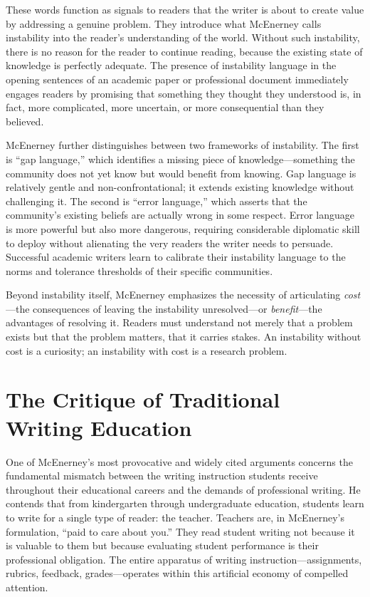 \documentclass[12pt]{article}
\begin{document}
These words function as signals to readers that the writer is about to create value by addressing a genuine problem. They introduce what McEnerney calls instability into the reader's understanding of the world. Without such instability, there is no reason for the reader to continue reading, because the existing state of knowledge is perfectly adequate. The presence of instability language in the opening sentences of an academic paper or professional document immediately engages readers by promising that something they thought they understood is, in fact, more complicated, more uncertain, or more consequential than they believed.

McEnerney further distinguishes between two frameworks of instability. The first is ``gap language,'' which identifies a missing piece of knowledge---something the community does not yet know but would benefit from knowing. Gap language is relatively gentle and non-confrontational; it extends existing knowledge without challenging it. The second is ``error language,'' which asserts that the community's existing beliefs are actually wrong in some respect. Error language is more powerful but also more dangerous, requiring considerable diplomatic skill to deploy without alienating the very readers the writer needs to persuade. Successful academic writers learn to calibrate their instability language to the norms and tolerance thresholds of their specific communities.

Beyond instability itself, McEnerney emphasizes the necessity of articulating \textit{cost}---the consequences of leaving the instability unresolved---or \textit{benefit}---the advantages of resolving it. Readers must understand not merely that a problem exists but that the problem matters, that it carries stakes. An instability without cost is a curiosity; an instability with cost is a research problem.

\section*{The Critique of Traditional Writing Education}

One of McEnerney's most provocative and widely cited arguments concerns the fundamental mismatch between the writing instruction students receive throughout their educational careers and the demands of professional writing. He contends that from kindergarten through undergraduate education, students learn to write for a single type of reader: the teacher. Teachers are, in McEnerney's formulation, ``paid to care about you.'' They read student writing not because it is valuable to them but because evaluating student performance is their professional obligation. The entire apparatus of writing instruction---assignments, rubrics, feedback, grades---operates within this artificial economy of compelled attention.
\end{document}
